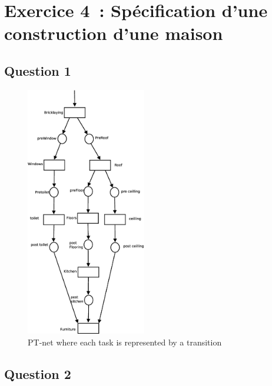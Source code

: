 \section*{Exercice 4~: Spécification d'une construction d'une maison}

\subsection*{Question 1}

\begin{figure}[h!]
\begin{center}
\includegraphics[height = 11cm]{exo41.eps} 
\caption{PT-net where each task is represented by a transition}
\end{center} 
\end{figure} 

\subsection*{Question 2}

